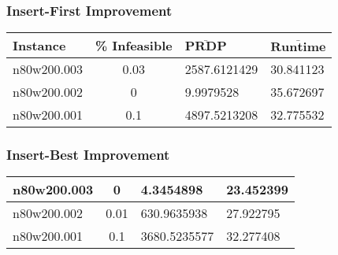 \subsubsection{Insert-First Improvement}
\begin{center}
\begin{tabular}{|l|c|l|l|}
\hline
\textbf{Instance}& \textbf{\% Infeasible} & $\mathbf{\bar{PRDP}}$ &$\mathbf{\bar{Runtime}}$\\
\hline
n80w200.003&0.03&2587.6121429&30.841123\\
\hline
n80w200.002&0&9.9979528&35.672697\\
\hline
n80w200.001&0.1&4897.5213208&32.775532\\
\hline
\end{tabular}
\label{tab:i.f.h}
\end{center}

\subsubsection{Insert-Best Improvement}
\begin{center}
\begin{tabular}{|l|c|l|l|}
\hline
n80w200.003&0&4.3454898&23.452399\\
\hline
n80w200.002&0.01&630.9635938&27.922795\\
\hline
n80w200.001&0.1&3680.5235577&32.277408\\
\hline
\end{tabular}
\label{tab:i.b.h}
\end{center}

